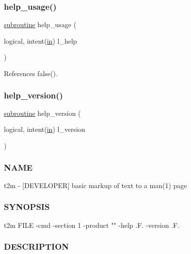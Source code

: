 \subsubsection{\texorpdfstring{help\+\_\+usage()}{help\_usage()}}
{\footnotesize\ttfamily \hyperlink{M__stopwatch_83_8txt_acfbcff50169d691ff02d4a123ed70482}{subroutine} help\+\_\+usage (\begin{DoxyParamCaption}\item[{logical, intent(\hyperlink{M__journal_83_8txt_afce72651d1eed785a2132bee863b2f38}{in})}]{l\+\_\+help }\end{DoxyParamCaption})}



References false().

\mbox{\label{t2m_8f90_a39c21619b08a3c22f19e2306efd7f766}} 
\subsubsection{\texorpdfstring{help\+\_\+version()}{help\_version()}}
{\footnotesize\ttfamily \hyperlink{M__stopwatch_83_8txt_acfbcff50169d691ff02d4a123ed70482}{subroutine} help\+\_\+version (\begin{DoxyParamCaption}\item[{logical, intent(\hyperlink{M__journal_83_8txt_afce72651d1eed785a2132bee863b2f38}{in})}]{l\+\_\+version }\end{DoxyParamCaption})}



\subsubsection*{N\+A\+ME}

t2m -\/ \mbox{[}D\+E\+V\+E\+L\+O\+P\+ER\mbox{]} basic markup of text to a man(1) page 

\subsubsection*{S\+Y\+N\+O\+P\+S\+IS}

\begin{DoxyVerb}t2m FILE -cmd -section 1 -product "" -help .F. -version .F.
\end{DoxyVerb}


\subsubsection*{D\+E\+S\+C\+R\+I\+P\+T\+I\+ON}


